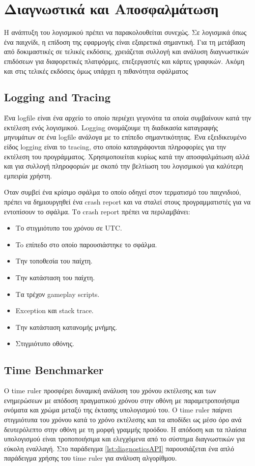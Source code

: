 \chapter{Διαγνωστικά και Αποσφαλμάτωση}
Η ανάπτυξη του λογισμικού πρέπει να παρακολουθείται συνεχώς. Σε λογισμικά όπως ένα παιχνίδι, η επίδοση της εφαρμογής είναι εξαιρετικά σημαντική. Για τη μετάβαση από δοκιμαστικές σε τελικές εκδόσεις, χρειάζεται συλλογή και ανάλυση διαγνωστικών επιδόσεων για διαφορετικές πλατφόρμες, επεξεργαστές και κάρτες γραφικών. Ακόμη και στις τελικές εκδόσεις όμως υπάρχει η πιθανότητα σφάλματος

\section{Logging and Tracing}
Ένα logfile είναι ένα αρχείο το οποίο περιέχει γεγονότα τα οποία συμβαίνουν κατά την εκτέλεση ενός λογισμικού. Logging ονομάζουμε τη διαδικασία καταγραφής μηνυμάτων σε ένα logfile ανάλογα με το επίπεδο σημαντικότητας. Ένα εξειδικευμένο είδος logging είναι το tracing, στο οποίο καταγράφονται πληροφορίες για την εκτέλεση του προγράμματος. Χρησιμοποιείται κυρίως κατά την αποσφαλμάτωση αλλά και για συλλογή πληροφοριών με σκοπό την βελτίωση του λογισμικού για καλύτερη εμπειρία χρήστη.

Όταν συμβεί ένα κρίσιμο σφάλμα το οποίο οδηγεί στον τερματισμό του παιχνιδιού, πρέπει να δημιουργηθεί ένα crash report και να σταλεί στους προγραμματιστές για να εντοπίσουν το σφάλμα.
Το crash report πρέπει να περιλαμβάνει:
\begin{itemize}
 \item Το στιγμιότυπο του χρόνου σε UTC.
 \item To επίπεδο στο οποίο παρουσιάστηκε το σφάλμα.
 \item Την τοποθεσία του παίχτη.
 \item Την κατάσταση του παίχτη.
 \item Τα τρέχον gameplay scripts.
 \item Exception και stack trace.
 \item Την κατάσταση κατανομής μνήμης.
 \item Στιγμιότυπο οθόνης.
\end{itemize}

\section{Time Benchmarker}
Ο time ruler προσφέρει δυναμική ανάλυση του χρόνου εκτέλεσης και των ενημερώσεων με απόδοση πραγματικού χρόνου στην οθόνη με παραμετροποιήσιμα ονόματα και χρώμα μεταξύ της έκτασης υπολογισμού του. O time ruler παίρνει στιγμιότυπα του χρόνου κατά το χρόνο εκτέλεσης και τα αποδίδει ως μέσο όρο ανά δευτερόλεπτο στην οθόνη με τη μορφή γραμμής προόδου.
Η απόδοση και τα πλαίσια υπολογισμού είναι τροποποιήσιμα και ελεγχόμενα από το σύστημα διαγνωστικών για εύκολη εναλλαγή. Στο παράδειγμα \ref{lst:diagnosticsAPI} παρουσιάζεται ένα απλό παράδειγμα χρήσης του time ruler για ανάλυση αλγορίθμου.

